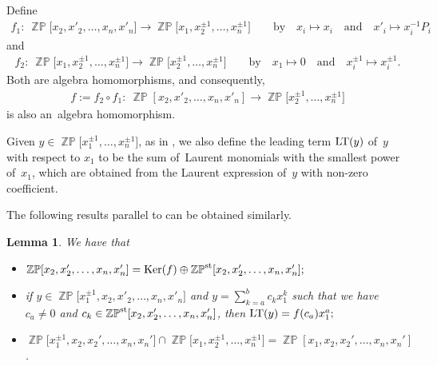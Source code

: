 \documentclass[10pt,a4paper]{amsart}
\numberwithin{equation}{section}
\newtheorem{Lemma}[Theorem]{Lemma}
\begin{document}
Define
\begin{gather*}
f_1\colon\ \mathop{\mathbb{ZP}}\big[x_{2},x'_{2},\ldots,x_n,x'_{n}]\rightarrow \mathop{\mathbb{ZP}}[x_1,x^{\pm1}_2,\ldots,x^{\pm1}_{n}\big]\qquad \text{by}\quad
x_i\mapsto x_i \quad\text{and}\quad x'_{i}\mapsto x_{i}^{-1}P_i
\end{gather*}
and
\begin{gather*}
f_2\colon\ \mathop{\mathbb{ZP}}\big[x_{1},x^{\pm1}_{2},\ldots,x^{\pm1}_{n}\big]\rightarrow \mathop{\mathbb{ZP}}\big[x^{\pm1}_2,\ldots,x^{\pm1}_{n}\big]\qquad \text{by}\quad
x_1\mapsto 0 \quad\text{and} \quad x_{i}^{\pm1}\mapsto x_{i}^{\pm1}.
\end{gather*}
Both are algebra homomorphisms, and consequently,
\begin{gather*}
f:=f_2\circ f_1\colon\ \mathop{\mathbb{ZP}}[x_{2},x'_{2},\ldots,x_n,x'_{n}]\rightarrow \mathop{\mathbb{ZP}}\big[x^{\pm1}_2,\ldots,x^{\pm1}_{n}\big]
\end{gather*}
is also an~algebra homomorphism.

Given $y\in\mathop{\mathbb{ZP}}\!\big[x^{\pm1}_1,\ldots, x^{\pm1}_{n}\big]$, as in \cite[Definition~6.3]{bfz}, we also define the leading term $\mathop{\rm LT}(y)$ of~$y$ with respect to $x_1$ to be the sum of~Laurent monomials with the smallest power of~$x_1$, which are obtained from the Laurent expression of~$y$ with non-zero coefficient.

The following results parallel to \cite[Lemmas 6.2,~6.4 and~6.5]{bfz} can be obtained similarly.
\begin{Lemma}\label{lemdirectsum}
We have that
\begin{itemize}\itemsep=0pt
 \item[{\rm (1)}] $\mathop{\mathbb{ZP}}[x_{2},x'_{2},\ldots,x_n,x'_{n}]={\rm Ker}(f)\oplus \mathop{\mathbb{ZP}}\nolimits^{\rm st}[x_{2},x'_{2},\ldots,x_n,x'_{n}];$
 \item[{\rm (2)}] if $y\in\mathop{\mathbb{ZP}}\!\big[x^{\pm1}_1,x_2,x'_2,\ldots,x_n,x'_{n}\big]$ and $y=\sum\limits_{k=a}^{b}c_kx_{1}^{k}$ such that we have $c_a\neq0$ and $c_k\in \mathop{\mathbb{ZP}}\nolimits^{\rm{st}}[x_2,x'_2,\ldots,x_n,x'_{n}]$, then ${\rm LT}(y)=f(c_a)x_{1}^{a};$
\item[{\rm (3)}] $\mathop{\mathbb{ZP}}\!\big[x_{1}^{\pm1},x_{2},x_{2}',\ldots,x_{n},x_{n}'\big] \cap \mathop{\mathbb{ZP}}\!\big[x_{1},x_{2}^{\pm1},\ldots,x_{n}^{\pm1}\big] =\mathop{\mathbb{ZP}}[x_{1},x_{2},x_{2}',\ldots,x_{n},x_{n}']$.
\end{itemize}
\end{Lemma}
\end{document}
